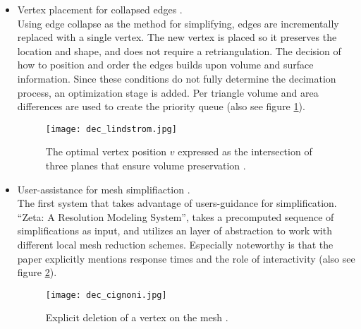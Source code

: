\begin{itemize}
    \item Vertex placement for collapsed edges \citep[cf.][]{Lindstrom1998}.\\
Using edge collapse as the method for simplifying, edges are incrementally replaced with a single vertex.
The new vertex is placed so it preserves the location and shape, and does not require a retriangulation.
The decision of how to position and order the edges builds upon volume and surface information.
Since these conditions do not fully determine the decimation process, an optimization stage is added.
Per triangle volume and area differences are used to create the priority queue (also see figure \ref{fig:dec_lindstrom}).
\begin{figure}[ht]
\centering
\texttt{[image: dec\_lindstrom.jpg]}
\caption{The optimal vertex position $v$ expressed as the intersection of three planes that ensure volume preservation \citep[][p.284]{Lindstrom1998}.}
\label{fig:dec_lindstrom}
\end{figure}

    \item User-assistance for mesh simplifiaction \citep[cf.][]{Cignoni1998a}.\\
The first system that takes advantage of users-guidance for simplification.
``Zeta: A Resolution Modeling System'', takes a precomputed sequence of simplifications as input, and utilizes an layer of abstraction to work with different local mesh reduction schemes.
Especially noteworthy is that the paper explicitly mentions response times and the role of interactivity (also see figure \ref{fig:dec_cignoni}).
\begin{figure}[ht]
\centering
\texttt{[image: dec\_cignoni.jpg]}
\caption{Explicit deletion of a vertex on the mesh \citep[][p.312]{Cignoni1998a}.}
\label{fig:dec_cignoni}
\end{figure}


\end{itemize}

